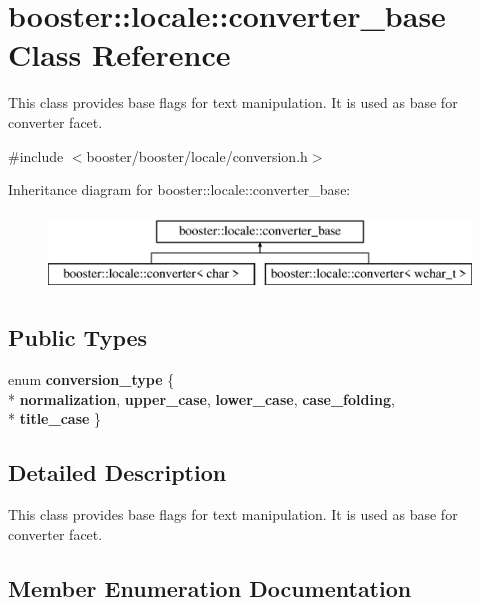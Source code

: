\section{booster\-:\-:locale\-:\-:converter\-\_\-base Class Reference}
\label{classbooster_1_1locale_1_1converter__base}


This class provides base flags for text manipulation. It is used as base for converter facet.  




{\ttfamily \#include $<$booster/booster/locale/conversion.\-h$>$}

Inheritance diagram for booster\-:\-:locale\-:\-:converter\-\_\-base\-:\begin{figure}[H]
\begin{center}
\leavevmode
\includegraphics[height=2.000000cm]{classbooster_1_1locale_1_1converter__base}
\end{center}
\end{figure}
\subsection*{Public Types}
\begin{DoxyCompactItemize}
\item 
enum {\bf conversion\-\_\-type} \{ \\*
{\bf normalization}, 
{\bf upper\-\_\-case}, 
{\bf lower\-\_\-case}, 
{\bf case\-\_\-folding}, 
\\*
{\bf title\-\_\-case}
 \}
\end{DoxyCompactItemize}


\subsection{Detailed Description}
This class provides base flags for text manipulation. It is used as base for converter facet. 

\subsection{Member Enumeration Documentation}
